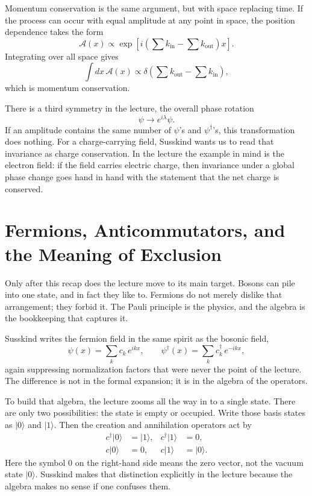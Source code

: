 Momentum conservation is the same argument, but with space replacing time. If the process can occur with equal amplitude at any point in space, the position dependence takes the form
\begin{equation}
\mathcal{A}(x)\propto
\exp\!\left[
i\left(
\sum k_{\mathrm{in}}-\sum k_{\mathrm{out}}
\right)x
\right].
\end{equation}
Integrating over all space gives
\begin{equation}
\int dx\,\mathcal{A}(x)\propto
\delta\!\left(
\sum k_{\mathrm{out}}-\sum k_{\mathrm{in}}
\right),
\end{equation}
which is momentum conservation.

There is a third symmetry in the lecture, the overall phase rotation
\begin{equation}
\psi\longrightarrow e^{i\lambda}\psi.
\end{equation}
If an amplitude contains the same number of \(\psi\)'s and \(\psi^\dagger\)'s, this transformation does nothing. For a charge-carrying field, Susskind wants us to read that invariance as charge conservation. In the lecture the example in mind is the electron field: if the field carries electric charge, then invariance under a global phase change goes hand in hand with the statement that the net charge is conserved.

\section{Fermions, Anticommutators, and the Meaning of Exclusion}

Only after this recap does the lecture move to its main target. Bosons can pile into one state, and in fact they like to. Fermions do not merely dislike that arrangement; they forbid it. The Pauli principle is the physics, and the algebra is the bookkeeping that captures it.

Susskind writes the fermion field in the same spirit as the bosonic field,
\begin{equation}
\psi(x)=\sum_k c_k\,e^{ikx},
\qquad
\psi^\dagger(x)=\sum_k c_k^\dagger\,e^{-ikx},
\end{equation}
again suppressing normalization factors that were never the point of the lecture. The difference is not in the formal expansion; it is in the algebra of the operators.

To build that algebra, the lecture zooms all the way in to a single state. There are only two possibilities: the state is empty or occupied. Write those basis states as \(|0\rangle\) and \(|1\rangle\). Then the creation and annihilation operators act by
\begin{align}
c^\dagger |0\rangle &= |1\rangle,
&
c^\dagger |1\rangle &= 0,
\\
c|0\rangle &= 0,
&
c|1\rangle &= |0\rangle.
\end{align}
Here the symbol \(0\) on the right-hand side means the zero vector, not the vacuum state \(|0\rangle\). Susskind makes that distinction explicitly in the lecture because the algebra makes no sense if one confuses them.

